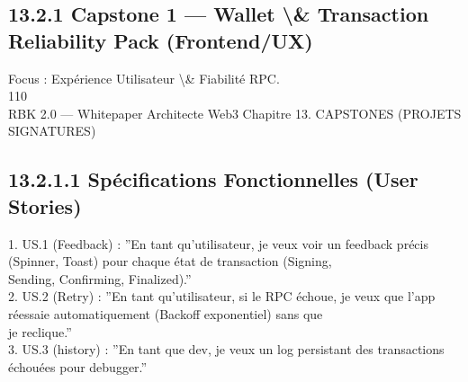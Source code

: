 \documentclass[12pt,landscape,a4paper]{article}
\begin{document}
\subsection{13.2.1 Capstone 1 — Wallet \textbackslash{}& Transaction Reliability Pack (Frontend/UX)}
Focus : Expérience Utilisateur \textbackslash{}& Fiabilité RPC.\\
\vspace{0.5em}
\vspace{0.5em}
\vspace{0.5em}
\vspace{0.5em}
110\\
RBK 2.0 — Whitepaper Architecte Web3                                                     Chapitre 13. CAPSTONES (PROJETS SIGNATURES)\\
\vspace{0.5em}
\vspace{0.5em}
\subsection{13.2.1.1 Spécifications Fonctionnelles (User Stories)}
\vspace{0.5em}
1. US.1 (Feedback) : ”En tant qu’utilisateur, je veux voir un feedback précis (Spinner, Toast) pour chaque état de transaction (Signing,\\
Sending, Confirming, Finalized).”\\
\vspace{0.5em}
2. US.2 (Retry) : ”En tant qu’utilisateur, si le RPC échoue, je veux que l’app réessaie automatiquement (Backoff exponentiel) sans que\\
je reclique.”\\
\vspace{0.5em}
3. US.3 (history) : ”En tant que dev, je veux un log persistant des transactions échouées pour debugger.”\\
\vspace{0.5em}
\end{document}
